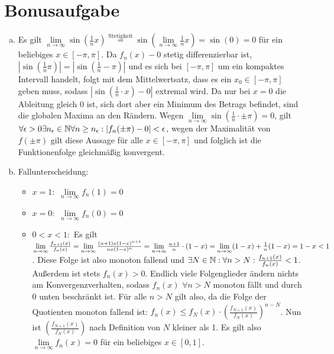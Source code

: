 \documentclass{article}
\begin{document}
    \section*{Bonusaufgabe}
    \begin{enumerate}[(a)]
        \item Es gilt $\lim\limits_{n\to\infty}\sin\left(\frac{1}{n}x\right) \overset{\text{Stetigkeit}}{=} \sin\left(\lim\limits_{n\to\infty}\frac{1}{n}x\right) = \sin(0) = 0$ für ein beliebiges $x \in [-\pi, \pi]$. Da $f_n(x) -0$ stetig differenzierbar ist, $|\sin\left(\frac{1}{n}\pi\right)| = |\sin\left(\frac{1}{n}-\pi\right)|$ und es sich bei $[-\pi, \pi]$ um ein kompaktes Intervall handelt, folgt mit dem Mittelwertsatz, dass es ein $x_0\in [-\pi, \pi]$ geben muss, sodass $|\sin(\frac{1}{n} \cdot x) - 0|$ extremal wird. Da nur bei $x = 0$ die Ableitung gleich 0 ist, sich dort aber ein Minimum des Betrags befindet, sind die globalen Maxima an den Rändern.
        Wegen $\lim\limits_{n\to\infty}\sin\left(\frac{1}{n}\cdot \pm\pi\right) = 0$, 
        gilt $\forall \epsilon > 0 \exists n_\epsilon \in \mathbb{N} \forall n \geq n_\epsilon: |f_n(\pm\pi) - 0| < \epsilon$, wegen der Maximalität von $f(\pm \pi)$ gilt diese Aussage für alle $x\in [-\pi, \pi]$ und folglich ist die Funktionenfolge gleichmäßig konvergent.
        \item Fallunterscheidung:
        \begin{itemize}
            \item $x = 1:$ $\lim\limits_{n\to\infty} f_n(1) = 0$
            \item $x = 0:$ $\lim\limits_{n\to\infty} f_n(0) = 0$
            \item $0 < x < 1:$ Es gilt $\lim\limits_{n\to\infty} \frac{f_{n+1}(x)}{f_n(x)} =\lim\limits_{n\to\infty} \frac{(n+1)x(1-x)^{n+1}}{nx(1-x)^n}\\
            = \lim\limits_{n\to\infty}\frac{n+1}{n}\cdot (1-x) = \lim\limits_{n\to\infty} (1-x) + \frac{1}{n}(1-x) = 1-x < 1$. Diese Folge ist also monoton fallend und $\exists N \in \mathbb{N}:\forall n > N: \frac{f_{n+1}(x)}{f_n(x)} < 1$. Außerdem ist stets $f_n(x) > 0$. Endlich viele Folgenglieder ändern nichts am Konvergenzverhalten, sodass $f_n(x)$ $\forall n > N$ monoton fällt und durch 0 unten beschränkt ist. Für alle $n > N$ gilt also, da die Folge der Quotienten monoton fallend ist: $f_n(x) \leq f_N(x) \cdot \left(\frac{f_{N+1}(x)}{f_{N}(x)}\right)^{n-N}$. Nun ist $\left(\frac{f_{N+1}(x)}{f_{N}(x)}\right)$ nach Definition von $N$ kleiner als 1. Es gilt also $\lim\limits_{n\to\infty} f_n(x) = 0$ für ein beliebiges $x\in [0,1]$.

\end{itemize}
\end{enumerate}
\end{document}
